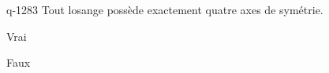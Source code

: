 \begin{truefalse}{q-1283}
Tout losange possède exactement quatre axes de symétrie.
\item Vrai
\item* Faux
\end{truefalse}

